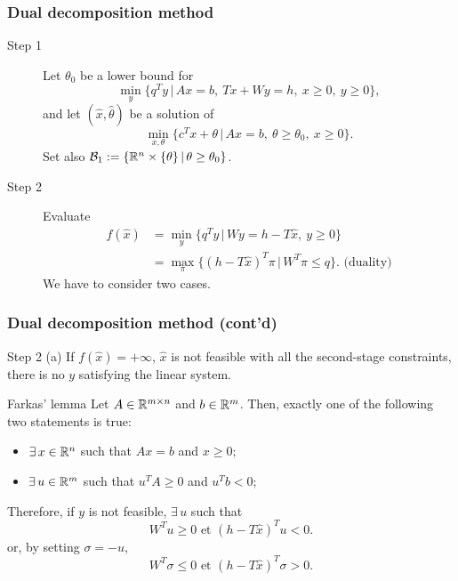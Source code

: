 \documentclass{beamer}
\begin{document}
\begin{frame}
\frametitle{Dual decomposition method}

\begin{description}
\item[\red Step 1]
Let $\theta_0$ be a lower bound for
\[
\min_y \lbrace q^Ty \,|\, Ax = b,\ Tx+Wy = h,\ x \geq 0,\ y \geq 0 \rbrace,
\]
and let $(\hat{x}, \hat{\theta})$ be a solution of
\[
\min_{x, \theta} \lbrace c^Tx + \theta \,|\, Ax = b,\ \theta \geq \theta_0,\ x
\geq 0 \rbrace.
\]
Set also $\mathcal{B}_1 := \lbrace {\mathbb{R}}^n \times \lbrace \theta \rbrace
\,|\, \theta \geq \theta_0 \rbrace$.
\item[\red Step 2]
Evaluate
\begin{align*}
f(\hat{x}) &= \min_y \lbrace q^Ty \,|\, Wy = h-T\hat{x},\ y \geq 0
\rbrace \\
&= \max_{\pi} \lbrace (h-T\hat{x})^T\pi \,|\, W^T\pi \leq q \rbrace. \mbox{ (duality)}
\end{align*}
We have to consider two cases.
\end{description}
\end{frame}

\begin{frame}
\frametitle{Dual decomposition method (cont'd)}

{\red Step 2 (a)}
If $f(\hat{x}) = +\infty$, $\hat{x}$ is not feasible with all the second-stage constraints, there is no $y$ satisfying the linear system.

\mbox{}

\begin{block}{Farkas' lemma}
Let $A \in {\mathbb{R}}^{m \times n}$ and $b \in {\mathbb{R}}^m$.
Then, exactly one of the following two statements is true:
\begin{itemize}
\item
$\exists\, x \in {\mathbb{R}}^n$ such that $Ax = b$ and $x \geq 0$;
\item
$\exists\, u \in {\mathbb{R}}^m$ such that $u^T A \geq 0$ and $u^T b < 0$;
\end{itemize}
\end{block}
	
\mbox{}

Therefore, if $y$ is not feasible, $\exists\, u$ such that
\[
W^Tu \geq 0 \mbox{ et } (h - T\hat{x})^T u < 0.
\]
or, by setting $\sigma = -u$,
\[
W^T\sigma \leq 0 \mbox{ et } (h - T\hat{x})^T \sigma > 0.
\]

\end{frame}
\end{document}
